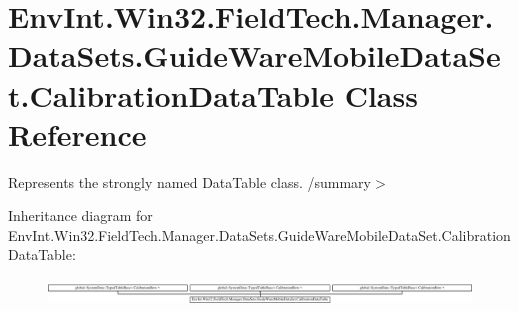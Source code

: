 \hypertarget{class_env_int_1_1_win32_1_1_field_tech_1_1_manager_1_1_data_sets_1_1_guide_ware_mobile_data_set_1_1_calibration_data_table}{}\section{Env\+Int.\+Win32.\+Field\+Tech.\+Manager.\+Data\+Sets.\+Guide\+Ware\+Mobile\+Data\+Set.\+Calibration\+Data\+Table Class Reference}
\label{class_env_int_1_1_win32_1_1_field_tech_1_1_manager_1_1_data_sets_1_1_guide_ware_mobile_data_set_1_1_calibration_data_table}


Represents the strongly named Data\+Table class. /summary$>$  


Inheritance diagram for Env\+Int.\+Win32.\+Field\+Tech.\+Manager.\+Data\+Sets.\+Guide\+Ware\+Mobile\+Data\+Set.\+Calibration\+Data\+Table\+:\begin{figure}[H]
\begin{center}
\leavevmode
\includegraphics[height=0.699126cm]{class_env_int_1_1_win32_1_1_field_tech_1_1_manager_1_1_data_sets_1_1_guide_ware_mobile_data_set_1_1_calibration_data_table}
\end{center}
\end{figure}
